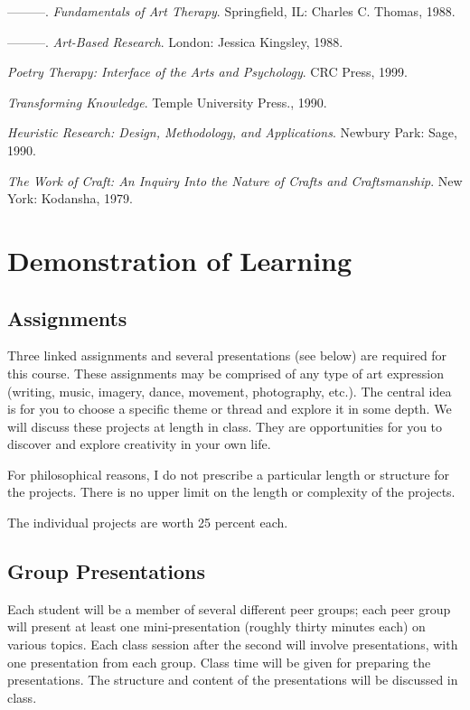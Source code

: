 \documentclass[letterpaper,10pt,headsepline]{scrreprt}
\begin{document}
\begin{description}
\item ---------. \textit{Fundamentals of Art Therapy}. Springfield, IL: Charles C. Thomas, 1988.
\item ---------. \textit{Art-Based Research}. London: Jessica Kingsley, 1988.
\item [Mazza, Nick] \textit{Poetry Therapy: Interface of the Arts and Psychology}. CRC Press, 1999.
\item [Minnich, E. K.] \textit{Transforming Knowledge}. Temple University Press., 1990.
\item [Moustakas, C.] \textit{Heuristic Research: Design, Methodology, and Applications}. Newbury Park: Sage, 1990.
\item [Needleman, Carla] \textit{The Work of Craft: An Inquiry Into the Nature of Crafts and Craftsmanship}. New York: Kodansha, 1979.

\end{description}

\clearpage

\section{Demonstration of Learning}

\subsection{Assignments}
Three linked assignments and several presentations (see below) are required for this course. These assignments may be comprised of any type of art expression (writing, music, imagery, dance, movement, photography, etc.). The central idea is for you to choose a specific theme or thread and explore it in some depth. We will discuss these projects at length in class. They are opportunities for you to discover and explore creativity in your own life.

For philosophical reasons, I do not prescribe a particular length or structure for the projects. There is no upper limit on the length or complexity of the projects.

The individual projects are worth 25 percent each.

\newpage

\subsection{Group Presentations}

Each student will be a member of several different peer groups; each
peer group will present at least one mini-presentation (roughly thirty minutes each) on various topics. Each class session after the second will involve presentations, with one presentation from each group. Class time will be given for preparing the presentations. The structure and content of the presentations will be discussed in class.
\end{document}
